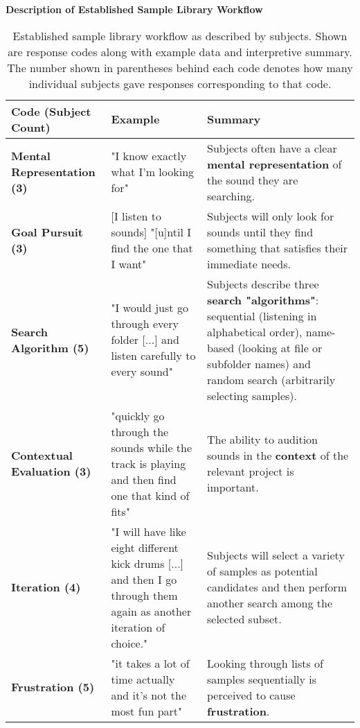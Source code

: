 \begin{table}[!htb]
  \renewcommand{\arraystretch}{1.2}
  \centering
  \textbf{Description of Established Sample Library Workflow} \\ [3mm]
  \footnotesize
  \colorbox{light-bg}{
  \begin{tabular}{ p{4.0cm} p{4.75cm} p{4.75cm} }
  \hline
    \textbf{Code (Subject Count)} & \textbf{Example} & \textbf{Summary} \\
    \hline
    \textbf{Mental Representation (3)}
    &
    "I know exactly what I'm looking for"
    &
    Subjects often have a clear \textbf{mental representation} of the sound they
    are searching.
    \\
    \textbf{Goal Pursuit (3)}
    &
    [I listen to sounds] "[u]ntil I find the one that I want"
    &
    Subjects will only look for sounds until they find something that satisfies
    their immediate needs.
    \\
    \textbf{Search Algorithm (5)}
    &
    "I would just go through every folder [...] and listen carefully to every
    sound"
    &
    Subjects describe three \textbf{search "algorithms"}: sequential
    (listening in alphabetical order), name-based (looking at file or subfolder
    names) and random search (arbitrarily selecting samples).
    \\
    \textbf{Contextual Evaluation (3)}
    &
    "quickly go through the sounds while the track is playing and then find
    one that kind of fits"
    &
    The ability to audition sounds in the \textbf{context} of the relevant
    project is important.
    \\
    \textbf{Iteration (4)}
    &
    "I will have like eight different kick drums [...] and then I go through
    them again as another iteration of choice."
    &
    Subjects will select a variety of samples as potential candidates and then
    perform another search among the selected subset.
    \\
    \textbf{Frustration (5)}
    &
    "it takes a lot of time actually and it's not the most fun part"
    &
    Looking through lists of samples sequentially is perceived to cause
    \textbf{frustration}.
    \\
  \end{tabular}}
  \caption[Established Sample Library Workflow Description: Response Codes]
  {Established sample library workflow as described by subjects. Shown are
  response codes along with example data and interpretive summary. The number
  shown in parentheses behind each code denotes how many individual subjects
  gave responses corresponding to that code.}
  \label{table:current_workflow_description}
\end{table}

